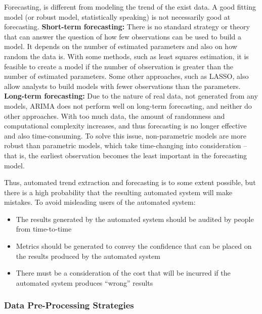 Forecasting, is different from modeling the trend of the exist data. A good fitting model (or robust model, statistically speaking) is not necessarily good at forecasting. 
\textbf{Short-term forecasting:}  There is no standard strategy or theory that can answer the question of how few observations can be used to build a model. It depends on the number of estimated parameters and also on how random the data is. With some methods, such as least squares estimation, it is feasible to create a model if the number of observation is greater than the number of estimated parameters. Some other approaches, such as LASSO, also allow analysts to build models with fewer observations than the parameters. 
\textbf{Long-term forecasting:}  Due to the nature of real data, not generated from any models, ARIMA does not perform well on long-term forecasting, and neither do other approaches. With too much data, the amount of randomness and computational complexity increases, and thus forecasting is no longer effective and also time-consuming. To solve this issue, non-parametric models are more robust than parametric models, which take time-changing into consideration -- that is, the earliest observation becomes the least important in the forecasting model. 

Thus, automated trend extraction and forecasting is to some extent possible, but there is a high probability that the resulting automated system will make mistakes. To avoid misleading users of the automated system:
 \begin{itemize}[noitemsep]
\item The results generated by the automated system should be audited by people from time-to-time
\item Metrics should be generated to convey the confidence that can be placed on the results produced by the automated system
\item There must be a consideration of the cost that will be incurred if the automated system produces ``wrong'' results
\end{itemize}

\subsubsection{Data Pre-Processing Strategies}

